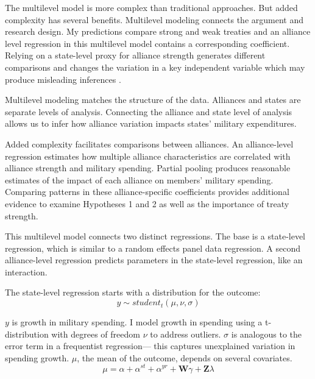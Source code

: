 \documentclass[12pt]{article}
\begin{document}
The multilevel model is more complex than traditional approaches. 
But added complexity has several benefits. 
Multilevel modeling connects the argument and research design. 
My predictions compare strong and weak treaties and an alliance level regression in this multilevel model contains a corresponding coefficient.
Relying on a state-level proxy for alliance strength generates different comparisons and changes the variation in a key independent variable which may produce misleading inferences \citep{McElreath2016}. 


Multilevel modeling matches the structure of the data.
Alliances and states are separate levels of analysis. 
Connecting the alliance and state level of analysis allows us to infer how alliance variation impacts states' military expenditures. 


Added complexity facilitates comparisons between alliances. 
An alliance-level regression estimates how multiple alliance characteristics are correlated with alliance strength and military spending.
Partial pooling produces reasonable estimates of the impact of each alliance on members' military spending. 
Comparing patterns in these alliance-specific coefficients provides additional evidence to examine Hypotheses 1 and 2 as well as the importance of treaty strength. 


This multilevel model connects two distinct regressions. 
The base is a state-level regression, which is similar to a random effects panel data regression.
A second alliance-level regression predicts parameters in the state-level regression, like an interaction. 


The state-level regression starts with a distribution for the outcome:
\begin{equation}
y \sim student_t(\mu, \nu, \sigma)
\end{equation}
 
$y$ is growth in military spending. 
I model growth in spending using a t-distribution with degrees of freedom $\nu$ to address outliers.
$\sigma$ is analogous to the error term in a frequentist regression--- this captures unexplained variation in spending growth.  
$\mu$, the mean of the outcome, depends on several covariates.
\begin{equation}
\mu = \alpha + \alpha^{st} + \alpha^{yr} +\textbf{W} \gamma + \textbf{Z} \lambda
\end{equation}
\end{document}
